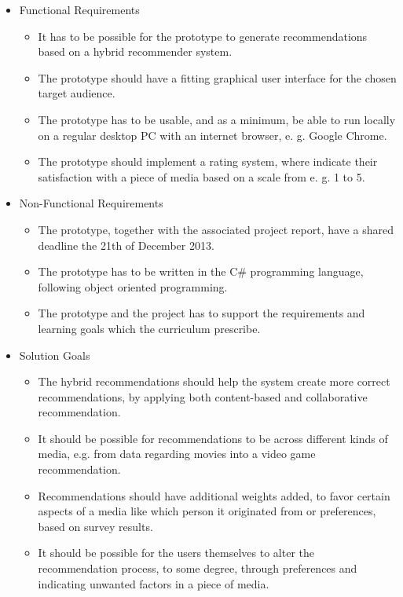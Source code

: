 \begin{itemize}
	\item Functional Requirements
	\begin{itemize}
		\item It has to be possible for the prototype to generate recommendations based on a hybrid recommender system.
		\item The prototype should have a fitting graphical user interface for the chosen target audience.
		\item The prototype has to be usable, and as a minimum, be able to run locally on a regular desktop PC with an internet browser, e. g. Google Chrome.
		\item The prototype should implement a rating system, where indicate their satisfaction with a piece of media based on a scale from e. g. 1 to 5.
	\end{itemize}
	\item Non-Functional Requirements
	\begin{itemize}
		\item The prototype, together with the associated project report, have a shared deadline the 21th of December 2013.
		\item The prototype has to be written in the C\# programming language, following object oriented programming.
		\item The prototype and the project has to support the requirements and learning goals which the curriculum prescribe.
	\end{itemize}
	\item Solution Goals
	\begin{itemize}
		\item The hybrid recommendations should help the system create more correct recommendations, by applying both content-based and collaborative recommendation.
		\item It should be possible for recommendations to be across different kinds of media, e.g. from data regarding movies into a video game recommendation.
		\item Recommendations should have additional weights added, to favor certain aspects of a media like which person it originated from or preferences, based on survey results.
		\item It should be possible for the users themselves to alter the recommendation process, to some degree, through preferences and indicating unwanted factors in a piece of media.
	\end{itemize}
\end{itemize}